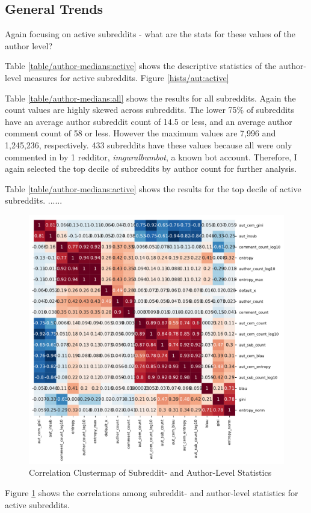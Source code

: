 

 \label{hists/aut:active}

\subsection{General Trends}
Again focusing on active subreddits - what are the stats for these values of the author level?

Table \ref{table/author-medians:active} shows the descriptive statistics of the author-level measures for active subreddits. Figure \ref{hists/aut:active}


Table \ref{table/author-medians:all} shows the results for all subreddits. Again the count values are highly skewed across subreddits. The lower 75\% of subreddits have an average author subreddit count of 14.5 or less, and an average author comment count of 58 or less. However the maximum values are 7,996 and 1,245,236, respectively. 433 subreddits have these values because all were only commented in by 1 redditor, \textit{imguralbumbot}, a known bot account. Therefore, I again selected the top decile of subreddits by author count for further analysis.

Table \ref{table/author-medians:active} shows the results for the top decile of active subreddits. 
......

\begin{figure}
    \includegraphics[scale=0.7]{latex/corr-cluster-active.pdf}
    \caption{Correlation Clustermap of Subreddit- and Author-Level Statistics}
    \label{corr-active}
\end{figure}

Figure \ref{corr-active} shows the correlations among subreddit- and author-level statistics for active subreddits.

